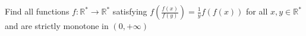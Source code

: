 Find all functions $ f:\mathbb{R^{\ast }}\rightarrow \mathbb{ R^{\ast }}$ satisfying $f(\frac{f(x)}{f(y)})=\frac{1}{y}f(f(x))$ for all $x,y\in \mathbb{R^{\ast }}$
and are strictly monotone in $(0,+\infty  )$
